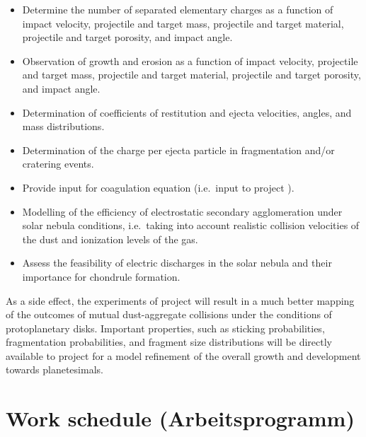\begin{itemize}

\item Determine the number of separated elementary charges as a
function of impact velocity, projectile and target mass,
projectile and target material, projectile and target porosity,
and impact angle.

\item Observation of growth and erosion as a function of impact
velocity, projectile and target mass, projectile and target
material, projectile and target porosity, and impact angle.

\item Determination of coefficients of restitution and ejecta
velocities, angles, and mass distributions.

\item Determination of the charge per ejecta particle in
fragmentation and/or cratering events.

\item Provide input for coagulation equation (i.e.\ input to
project \projdul{}).

\item Modelling of the efficiency of electrostatic secondary
agglomeration under solar nebula conditions, i.e.\ taking into
account realistic collision velocities of the dust and ionization
levels of the gas.

\item Assess the feasibility of electric discharges in the solar
nebula and their importance for chondrule formation.

\end{itemize}

As a side effect, the experiments of project \projblum{} will
result in a much better mapping of the outcomes of mutual
dust-aggregate collisions under the conditions of protoplanetary
disks. Important properties, such as sticking probabilities,
fragmentation probabilities, and fragment size distributions will
be directly available to project \projdul{} for a model refinement
of the overall growth and development towards planetesimals.


\section{Work schedule (Arbeitsprogramm)}
